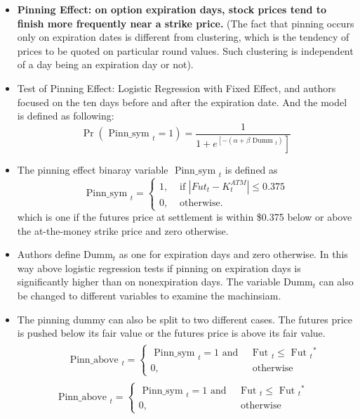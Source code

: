 \documentclass[10pt]{report}
\begin{document}
\begin{itemize}
    \item \textbf{Pinning Effect: on option expiration days, stock prices tend to finish more frequently near a strike price.} (The fact that pinning occurs only on expiration dates is different from clustering, which is the tendency of prices to be quoted on particular round values. Such clustering is independent of a day being an expiration day or not).
    \item Test of Pinning Effect: Logistic Regression with Fixed Effect, and authors focused on the ten days before and after the expiration date. And the model is defined as following:
    $$
    \operatorname{Pr}\left(\text { Pinn\_sym }_t=1\right)=\frac{1}{\left.1+e^{\left[-\left(\alpha+\beta \text { Dumm }_t\right)\right.}\right]}
    $$
    \item The pinning effect binaray variable $\text { Pinn\_sym }_t$ is defined as
    $$
\text { Pinn\_sym }_t= \begin{cases}1, & \text { if }\left|F u t_t-K_t^{A T M}\right| \leq 0.375 \\ 0, & \text { otherwise. }\end{cases}
$$
which is one if the
futures price at settlement is within \$0.375 below or
above the at-the-money strike price and zero otherwise.
    \item Authors define $\text{Dumm}_t$ as one for expiration days and zero otherwise. In this way above logistic regression tests if pinning on expiration days is significantly higher than on nonexpiration days. The variable $\text{Dumm}_t$ can also be changed to different variables to examine the machinsiam.
    \item The pinning dummy can also be split to two different cases. The futures price is pushed below its fair value or the futures price is above its fair value. 
    $$
\begin{aligned}
&\begin{aligned}
& \text { Pinn\_above }_t=\left\{\begin{array}{lr}
\text { Pinn\_sym }_t=1 \text { and } & \text { Fut }_t \leq \text { Fut }_t{ }^*   \\
0, & \text { otherwise }
\end{array}\right.
\end{aligned}\\
&\text { Pinn\_above }_t=\left\{\begin{array}{lr}
\text { Pinn\_sym }_t=1 \text { and } & \text { Fut }_t \leq \text { Fut }_t{ }^*  \\
0, & \text { otherwise }
\end{array}\right.
\end{aligned}
$$
\end{itemize}
\end{document}
